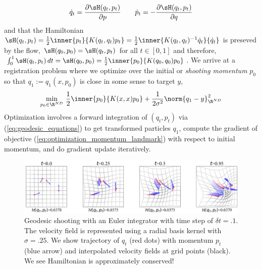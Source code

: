 \documentclass[11pt]{article}
\begin{document}
\begin{align}
    \dot{q}_t
        = \frac{\partial \sH(q_t,p_t)}{\partial p}
    \quad\quad
    \dot{p}_t
        = - \frac{\partial \sH(q_t,p_t)}{\partial q}
    \label{eq:geodesic_equations}
\end{align}
and that the Hamiltonian $\sH(q_t,p_t) = \frac{1}{2}\inner{p_t}{K(q_t,q_t)p_t} = \frac{1}{2}\inner{K(q_t,q_t)^{-1}\dot{q}_t}{\dot{q}_t}$ is preseved by the flow, $\sH(q_0,p_0)  = \sH(q_t,p_t)$ for all $t\in [0,1]$ and therefore, $\int_0^1 \sH(q_t,p_t) \, dt = \sH(q_0, p_0) = \frac{1}{2} \inner{ p_0 }{ K(q_0,q_0) p_0 }$. We arrive at a registration problem where we optimize over the initial or \textit{shooting momentum} $p_0$ so that $q_1 := q_1(x,p_0)$ is close in some sense to target $y$,
\begin{align}
    \min_{p_0\in\R^{ND}} \,
        \frac{1}{2} \inner{ p_0 }{ K(x,x) p_0 } + \frac{1}{2\sigma^2} \norm{q_1 - y}_{\R^{ND}}^2
    \label{eq:optimization_momentum_landmark}
\end{align}
Optimization involves a forward integration of $(q_t,p_t)$ via (\ref{eq:geodesic_equations}) to get transformed particles $q_1$, compute the gradient of objective (\ref{eq:optimization_momentum_landmark}) with respect to initial momentum, and do gradient update iteratively.


\begin{center} 
\begin{figure}[h!]
    \includegraphics[width=\textwidth]{assets/plt_shooting} 
    \caption{Geodesic shooting with an Euler integrator with time step of $\delta t = .1$. The velocity field is represented using a radial basis kernel with $\sigma=.25$. We show trajectory of $q_t$ (red dots) with momentum $p_t$ (blue arrow) and interpolated velocity fields at grid points (black). We see Hamiltonian is approximately conserved!}
    \label{fig:plt_shooting}
\end{figure} 
\end{center} 
\end{document}
